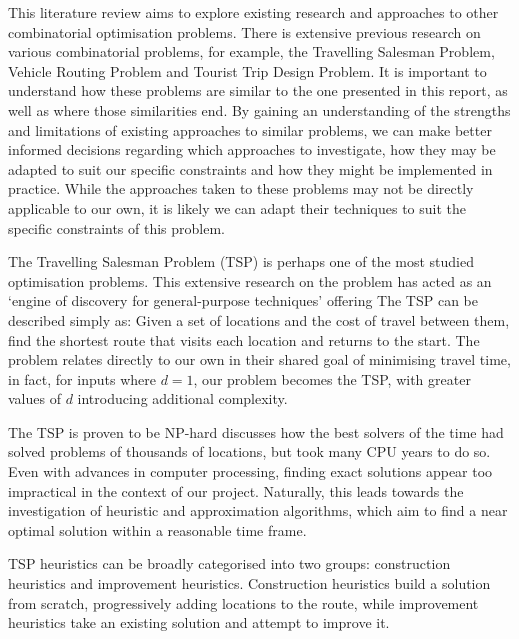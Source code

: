 This literature review aims to explore existing research and approaches to other combinatorial optimisation problems.
There is extensive previous research on various combinatorial problems, for example, the Travelling Salesman
Problem, Vehicle Routing Problem and Tourist Trip Design Problem.
It is important to understand how these problems are similar to the one presented in this report, as well as where
those similarities end.
By gaining an understanding of the strengths and limitations of existing approaches to similar problems, we can make
better informed decisions regarding which approaches to investigate, how they may be adapted to suit our specific
constraints and how they might be implemented in practice.
While the approaches taken to these problems may not be directly applicable to our own, it is likely we can adapt their
techniques to suit the specific constraints of this problem.


The Travelling Salesman Problem (TSP) is perhaps one of the most studied optimisation problems.
This extensive research on the problem has acted as an `engine of discovery for general-purpose techniques' offering
The TSP can be described simply as: Given a set of locations and the cost of travel between them, find the shortest
route that visits each location and returns to the start\parencite[p. 1]{applegate2006traveling}.
The problem relates directly to our own in their shared goal of minimising travel time, in fact, for inputs where
$d = 1$, our problem becomes the TSP, with greater values of $d$ introducing additional complexity.

The TSP is proven to be NP-hard\parencite[p. 1096--1097{cormen2022introduction}, meaning that there
are no known algorithms capable of solving the problem in polynomial time.
Exact methods, such as brute force, branch-and-bound and dynamic programming are capable of finding optimal
solutions, they just take an impractically long time to do so.
\textcite[p. 489--530]{applegate2006traveling} discusses how the best solvers of the time had solved problems of
thousands of locations, but took many CPU years to do so.
Even with advances in computer processing, finding exact solutions appear too impractical in the context of our project.
Naturally, this leads towards the investigation of heuristic and approximation algorithms, which aim to find a near
optimal solution within a reasonable time frame.

TSP heuristics can be broadly categorised into two groups: construction heuristics and improvement heuristics.
Construction heuristics build a solution from scratch, progressively adding locations to the route, while improvement
heuristics take an existing solution and attempt to improve it\parencite[p. 242]{laporte1992traveling}.\\

